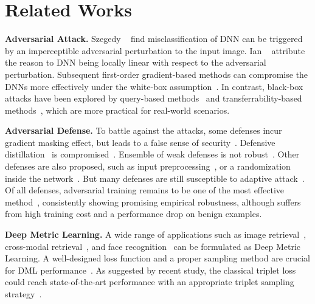 \documentclass[10pt,twocolumn,letterpaper]{article}
\newcommand{\oo}[1]{\textcolor{orange}{#1}}
\begin{document}
\section{Related Works}
\label{sec:2}

\begin{comment}
\oo{In potential of future works}
Deep metric learning on adversarial example is also used for improving
adversarial robustness for deep classifiers~\cite{mao2019metric}.
\end{comment}

\textbf{Adversarial Attack.}
%
Szegedy \etal~\cite{l-bfgs} find misclassification of DNN can be triggered by
an imperceptible adversarial perturbation to the input image.
%
Ian \etal~\cite{fgsm} attribute the reason to DNN being locally linear with
respect to the adversarial perturbation.
%
Subsequent first-order gradient-based methods can compromise the DNNs more
effectively under the white-box assumption~\cite{i-fgsm,madry,apgd}.
%
In contrast, black-box attacks have been explored by query-based
methods~\cite{nes-atk,spsa-atk} and transferrability-based
methods~\cite{di-fgsm}, which are more practical for real-world scenarios.

\textbf{Adversarial Defense.}
%
To battle against the attacks, some defenses incur gradient masking
effect, but leads to a false sense of security~\cite{obfuscated}.
%
Defensive distillation~\cite{distill2} is compromised~\cite{cw}.
%
Ensemble of weak defenses is not robust~\cite{ensembleweak}.
%
Other defenses are also proposed, such as input
preprocessing~\cite{deflecting}, or a randomization inside the
network~\cite{self-ensemble}.
%
But many defenses are still susceptible to adaptive attack~\cite{adaptive}.
%
Of all defenses, adversarial training remains to be one of the most effective
method~\cite{bilateral,advtrain-triplet,benchmarking}, consistently showing
promising empirical robustness, although suffers from high training
cost and a performance drop on benign examples.

\textbf{Deep Metric Learning.}
%
A wide range of applications such as image retrieval~\cite{imagesim2},
cross-modal retrieval~\cite{ladderloss}, and face recognition~\cite{facenet}
can be formulated as Deep Metric Learning.
%
A well-designed loss function and a proper sampling method are crucial for DML
performance~\cite{dmlreality}.  As suggested by recent study, the classical
triplet loss could reach state-of-the-art performance with an appropriate
triplet sampling strategy~\cite{revisiting}.
\end{document}
